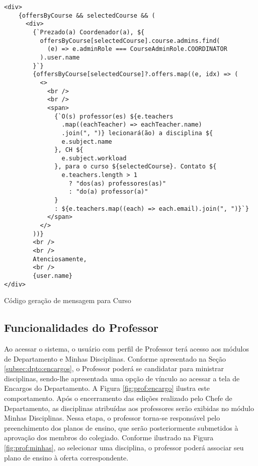 

\begin{listing}[h]
    \begin{verbatim}
<div>
    {offersByCourse && selectedCourse && (
      <div>
        {`Prezado(a) Coordenador(a), ${
          offersByCourse[selectedCourse].course.admins.find(
            (e) => e.adminRole === CourseAdminRole.COORDINATOR
          ).user.name
        }`}
        {offersByCourse[selectedCourse]?.offers.map((e, idx) => (
          <>
            <br />
            <br />
            <span>
              {`O(s) professor(es) ${e.teachers
                .map((eachTeacher) => eachTeacher.name)
                .join(", ")} lecionará(ão) a disciplina ${
                e.subject.name
              }, CH ${
                e.subject.workload
              }, para o curso ${selectedCourse}. Contato ${
                e.teachers.length > 1
                  ? "dos(as) professores(as)"
                  : "do(a) professor(a)"
              }
              : ${e.teachers.map((each) => each.email).join(", ")}`}
            </span>
          </>
        ))}
        <br />
        <br />
        Atenciosamente,
        <br />
        {user.name}
</div>    
    \end{verbatim}
    \caption{Código geração de mensagem para Curso}
    \label{list:text:curse}
\end{listing}


\subsection{Funcionalidades do Professor} \label{subsec:constr:professor}

Ao acessar o sistema, o usuário com perfil de Professor terá acesso aos módulos de Departamento e Minhas Disciplinas. Conforme apresentado na Seção \ref{subsec:dpto:encargos}, o Professor poderá se candidatar para ministrar disciplinas, sendo-lhe apresentada uma opção de vínculo ao acessar a tela de Encargos do Departamento. A Figura \ref{fig:prof:encargo} ilustra este comportamento. Após o encerramento das edições realizado pelo Chefe de Departamento, as disciplinas atribuídas aos professores serão exibidas no módulo Minhas Disciplinas. Nessa etapa, o professor torna-se responsável pelo preenchimento dos planos de ensino, que serão posteriormente submetidos à aprovação dos membros do colegiado. Conforme ilustrado na Figura \ref{fig:prof:minhas}, ao selecionar uma disciplina, o professor poderá associar seu plano de ensino à oferta correspondente.

